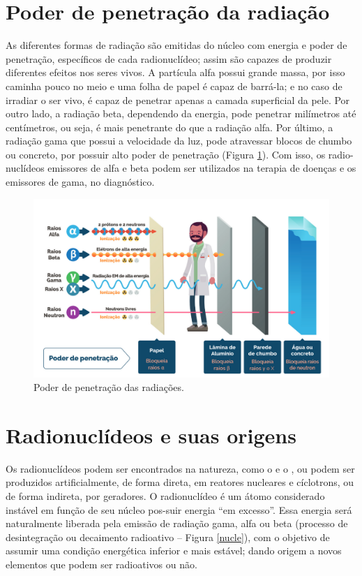 \documentclass[11pt]{article}
\begin{document}
\begin{multicols}{2}
\section{Poder de penetração da radiação}
\label{sec:orgb1c4542}
As diferentes formas de radiação são emitidas do núcleo com energia e poder de penetração, específicos de cada radionuclídeo; assim são capazes de produzir diferentes efeitos nos seres vivos. A partícula alfa possui grande massa, por isso caminha pouco no meio e uma folha de papel é capaz de barrá-la; e no caso de irradiar o ser vivo, é capaz de penetrar apenas a camada superficial da pele. Por outro lado, a radiação beta, dependendo da energia, pode penetrar milímetros até centímetros, ou seja, é mais penetrante do que a radiação alfa. Por último, a radiação gama que possui a velocidade da luz, pode atravessar blocos de chumbo ou concreto, por possuir alto poder de penetração (Figura \ref{poder}). Com isso, os radio-nuclídeos emissores de alfa e beta podem ser utilizados na terapia de doenças e os emissores de gama, no diagnóstico.

\begin{figure}[H]
\centering
\includegraphics[scale=0.22]{./../QM/poder.png}
\caption{\label{poder}Poder de penetração das radiações.}
\end{figure}



\section{Radionuclídeos e suas origens}
\label{sec:org8e937b8}

Os radionuclídeos podem ser encontrados na natureza, como o   e o , ou podem ser produzidos artificialmente, de forma direta, em reatores nucleares e cíclotrons, ou de forma indireta, por geradores. O radionuclídeo é um átomo considerado instável em função de seu núcleo pos-suir energia “em excesso”. Essa energia será naturalmente liberada pela emissão de radiação gama, alfa ou beta (processo de desintegração ou decaimento radioativo – Figura \ref{nucle}), com o objetivo de assumir uma condição energética inferior e mais estável; dando origem a novos elementos que podem ser radioativos ou não.



\end{multicols}
\end{document}
